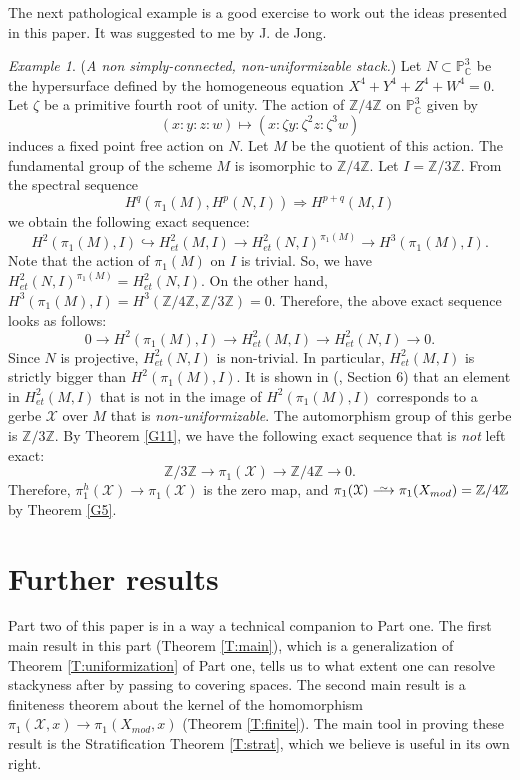 \documentclass{amsart}
\theoremstyle{definition}
\theoremstyle{remark}
\theoremstyle{remark}
\newtheorem{ex}[thm]{Example}
\newcommand{\X}{\mathcal{X}}
\newcommand{\Xm}{X_{mod}}
\newcommand{\pX}{\pi_1(\X,x)}
\newcommand{\pXm}{\pi_1(\Xm,x)}
\def\smashedlongrightarrow{\setbox0=\hbox{$\longrightarrow$}\ht0=1pt\box0}
\def\risom{\buildrel\sim\over{\smashedlongrightarrow}}
\begin{document}
The next pathological example is a good exercise to work out the
ideas presented in this paper. It was suggested to me by J. de
Jong.
\begin{ex}{\label{E:pathological}}({\em A non simply-connected,
non-uniformizable stack.})
 Let $N \subset \mathbb{P}^3_{\mathbb{C}}$
be the hypersurface defined by the homogeneous equation
$X^4+Y^4+Z^4+W^4=0$. Let $\zeta$ be a primitive fourth root of
unity. The action of $\mathbb{Z}/4\mathbb{Z}$ on
$\mathbb{P}^3_{\mathbb{C}}$ given by $$(x:y:z:w) \mapsto (x:\zeta
y:\zeta^{2}z:\zeta^{3}w)$$ induces a fixed point free action on
$N$. Let $M$ be the quotient of this action. The fundamental group
of the scheme $M$ is isomorphic to $\mathbb{Z}/4\mathbb{Z}$. Let
$I=\mathbb{Z}/3\mathbb{Z}$. From the spectral sequence $$
H^q(\pi_1(M),H^p(N,I)) \Rightarrow H^{p+q}(M,I)$$ \noindent we
obtain the following exact sequence: $$H^2(\pi_1(M),I)
\hookrightarrow H^2_{et}(M,I) \to H^2_{et}(N,I)^{\pi_1(M)}\to
H^3(\pi_1(M),I).$$ \noindent Note that the action of $\pi_1(M)$ on
$I$ is trivial. So, we have
$H^2_{et}(N,I)^{\pi_1(M)}=H^2_{et}(N,I)$. On the other hand,
$H^3(\pi_1(M),I)=H^3(\mathbb{Z}/4\mathbb{Z},\mathbb{Z}/3\mathbb{Z})=0$.
Therefore, the above exact sequence looks as follows: $$0 \to
H^2(\pi_1(M),I) \to  H^2_{et}(M,I) \to H^2_{et}(N,I) \to  0.$$
\noindent Since $N$ is projective,  $H^2_{et}(N,I)$ is
non-trivial. In particular, $H^2_{et}(M,I)$ is strictly bigger
than $H^2(\pi_1(M),I)$. It is shown in (\cite{Noohi}, Section 6)
that an element in $H^2_{et}(M,I)$ that is not in the image of
$H^2(\pi_1(M),I)$ corresponds to a gerbe $\X$ over $M$ that is
{\em non-uniformizable}. The automorphism group of this gerbe is
$\mathbb{Z}/3\mathbb{Z}$. By Theorem \ref{G11}, we have the
following exact sequence that is {\it not} left exact:
$$\mathbb{Z}/3\mathbb{Z} \to \pi_1(\X) \to \mathbb{Z}/4\mathbb{Z}
\to 0.$$ \noindent Therefore, $\pi_1^h(\X) \to \pi_1(\X)$ is the
zero map, and $\pi_1(\X) \risom \pi_1(\Xm)=\mathbb{Z}/4\mathbb{Z}$
by Theorem \ref{G5}.
\end{ex}

\pagebreak

{\Large\part{Further results}}{\label{C:further}}


\vspace{0.5in}

 Part two of this paper is in a way a technical companion to Part
 one. The first main result in this part (Theorem \ref{T:main}),
 which is a generalization of Theorem \ref{T:uniformization} of
 Part one, tells us to what extent one can resolve stackyness
 after by passing to covering spaces. The second main result is a
 finiteness theorem about the kernel of the homomorphism $\pX \to
 \pXm$ (Theorem \ref{T:finite}). The main tool in proving these
 result is the Stratification Theorem \ref{T:strat}, which we
 believe is useful in its own right.
\end{document}
